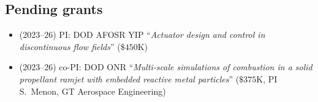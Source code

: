 \subsection{Pending grants}

\begin{itemize}

    \item (2023--26) PI: DOD AFOSR YIP ``\textit{Actuator design and control in discontinuous flow fields}'' ($\$450$K)
    \item (2023--26) co-PI: DOD ONR ``\textit{Multi-scale simulations of combustion in a solid propellant ramjet with embedded reactive metal particles}'' ($\$375$K, PI S.\ Menon, GT Aerospace Engineering)
\end{itemize}

